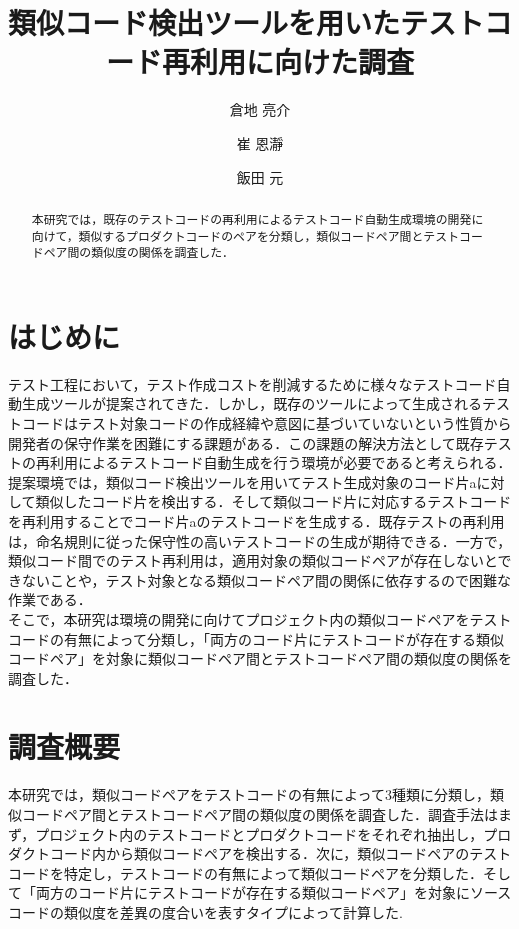 \documentclass{fose2019}           %
\title{類似コード検出ツールを用いたテストコード再利用に向けた調査}
\author{倉地 亮介}{Ryosuke Kurachi, 奈良先端科学技術大学院大学}
\author{崔 恩瀞}{Eunjong Choi, 京都工芸繊維大学}
\author{飯田 元}{Hajimu Iida, 奈良先端科学技術大学院大学}
\begin{document}
\maketitle


\begin{abstract}
本研究では，既存のテストコードの再利用によるテストコード自動生成環境の開発に向けて，類似するプロダクトコードのペアを分類し，類似コードペア間とテストコードペア間の類似度の関係を調査した．
\end{abstract}

\section{はじめに}
テスト工程において，テスト作成コストを削減するために様々なテストコード自動生成ツールが提案されてきた．しかし，既存のツールによって生成されるテストコードはテスト対象コードの作成経緯や意図に基づいていないという性質から開発者の保守作業を困難にする課題がある\cite{ICST}．この課題の解決方法として既存テストの再利用によるテストコード自動生成を行う環境が必要であると考えられる．
\\\indent 提案環境では，類似コード検出ツールを用いてテスト生成対象のコード片aに対して類似したコード片を検出する．そして類似コード片に対応するテストコードを再利用することでコード片aのテストコードを生成する．既存テストの再利用は，命名規則に従った保守性の高いテストコードの生成が期待できる．一方で，類似コード間でのテスト再利用は，適用対象の類似コードペアが存在しないとできないことや，テスト対象となる類似コードペア間の関係に依存するので困難な作業である．
\\\indent そこで，本研究は環境の開発に向けてプロジェクト内の類似コードペアをテストコードの有無によって分類し，「両方のコード片にテストコードが存在する類似コードペア」を対象に類似コードペア間とテストコードペア間の類似度の関係を調査した．

\section{調査概要}
本研究では，類似コードペアをテストコードの有無によって3種類に分類し，類似コードペア間とテストコードペア間の類似度の関係を調査した．調査手法はまず，プロジェクト内のテストコードとプロダクトコードをそれぞれ抽出し，プロダクトコード内から類似コードペアを検出する\cite{ICPC}．次に，類似コードペアのテストコードを特定し，テストコードの有無によって類似コードペアを分類した．そして「両方のコード片にテストコードが存在する類似コードペア」を対象にソースコードの類似度を差異の度合いを表すタイプ\cite{SCP}によって計算した.
\end{document}
